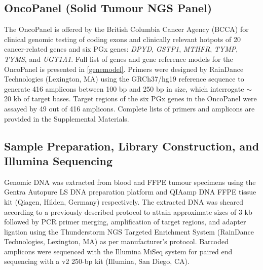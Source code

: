\documentclass{bmcart}
\begin{document}
\subsection*{OncoPanel (Solid Tumour NGS Panel)}
The OncoPanel is offered by the British Columbia Cancer Agency (BCCA) for clinical genomic testing of coding exons and clinically relevant hotpots of 20 cancer-related genes and six PGx genes: \textit{DPYD}, \textit{GSTP1}, \textit{MTHFR}, \textit{TYMP}, \textit{TYMS}, and \textit{UGT1A1}. Full list of genes and gene reference models for the OncoPanel is presented in \autoref{genemodel}. Primers were designed by RainDance Technologies (Lexington, MA) using the GRCh37/hg19 reference sequence to generate 416 amplicons between 100 bp and 250 bp in size, which interrogate $\sim$ 20 kb of target bases. Target regions of the six PGx genes in the OncoPanel were assayed by 49 out of 416 amplicons. Complete lists of primers and amplicons are provided in the Supplemental Materials.

\subsection*{Sample Preparation, Library Construction, and Illumina Sequencing}
Genomic DNA was extracted from blood and FFPE tumour specimens using the Gentra Autopure LS DNA preparation platform and QIAamp DNA FFPE tissue kit (Qiagen, Hilden, Germany) respectively. The extracted DNA was sheared according to a previously described protocol \cite{Bosdet2013} to attain approximate sizes of 3 kb followed by PCR primer merging, amplification of target regions, and adapter ligation using the Thunderstorm NGS Targeted Enrichment System (RainDance Technologies, Lexington, MA) as per manufacturer's protocol. Barcoded amplicons were sequenced with the Illumina MiSeq system for paired end sequencing with a v2 250-bp kit (Illumina, San Diego, CA).
\end{document}
